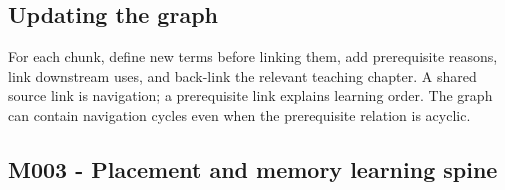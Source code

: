 \subsection{Updating the graph}\label{appendix-4ad47bdd269a-updating-the-graph}

For each chunk, define new terms before linking them, add prerequisite reasons, link downstream uses, and back-link the relevant teaching chapter. A shared source link is navigation; a prerequisite link explains learning order. The graph can contain navigation cycles even when the prerequisite relation is acyclic.

\subsection{M003 - Placement and memory learning spine}\label{appendix-4ad47bdd269a-m003---placement-and-memory-learning-spine}

